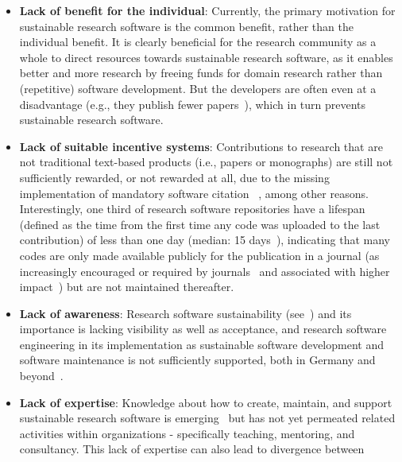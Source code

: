 \documentclass[a4paper,num-refs,numbers,sort&compress]{de-rse}
\begin{document}
\begin{itemize}
\item
  \textbf{Lack of benefit for the individual}:
  Currently, the primary motivation for
    sustainable research software is the common benefit, rather than the
    individual benefit. It is  clearly beneficial for the
    research community as a whole to direct resources towards sustainable
    research software, as it enables better and more
    research by freeing funds for domain research rather than
    (repetitive) software development. But the developers are often even at a disadvantage (e.g., they publish fewer papers~\cite{bangerth2014quo,Prins2015}), which
    in turn prevents sustainable research software.
\item
  \textbf{Lack of suitable incentive systems}: Contributions to research that are not
  traditional text-based products (i.e., papers or monographs) are still not sufficiently rewarded, or not rewarded at all, due to the missing implementation of mandatory software citation ~\cite{smithSoftwareCitationPrinciples2016,Hafer2009,Howison2016,Li2017,Li2019,Park2019,Pan2019,Doerr2019,druskatSoftwareDependenciesResearch2019,katzSoftwareCitationImplementation2019}, among other reasons. Interestingly, one third of research software repositories have a lifespan (defined as the time from the first time
any code was uploaded to the last contribution) of less than one day (median: 15 days~\cite{hasselbring2019fair}), indicating that many codes are only made available publicly for the publication in a journal (as increasingly encouraged or required by journals~\cite{Resnik2019139} and associated with higher impact~\cite{codeImpact}) but are not maintained thereafter. 
\item
  \textbf{Lack of awareness}: Research software sustainability (see~\cite{Venters2014,Goble2014,Druskat2016,KatzFundamentalsSoftwareSustainability2018}) and its
  importance is lacking visibility as well as acceptance, and research software
  engineering in its implementation as sustainable software development
  and software maintenance is not sufficiently supported, both in
  Germany and beyond~\cite{SSIRSE,NWOprofile,Casties2019}.
\item
  \textbf{Lack of expertise}: Knowledge about how to create, maintain, and
  support sustainable research software is emerging~\cite{Wilson2014,Stodden2014,Wilson2017} but
  has not yet permeated related activities within organizations - specifically
  teaching, mentoring, and consultancy. This lack of expertise can also lead to divergence between

\end{itemize}
\end{document}
